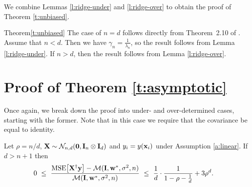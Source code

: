 \noindent
We combine Lemmas \ref{l:ridge-under} and \ref{l:ridge-over} to obtain
the proof of Theorem \ref{t:unbiased}.
\begin{proofof}{Theorem}{\ref{t:unbiased}}
The case of $n=d$ follows directly from Theorem~2.10 of
\cite{correcting-bias}.
Assume that $n<d$. Then we have
$\gamma_n=\frac1{\lambda_n}$, so the result follows
from Lemma \ref{l:ridge-under}.
If $n>d$, then the result follows from Lemma \ref{l:ridge-over}.
\end{proofof}

\section{Proof of Theorem \ref{t:asymptotic}}
\label{sec:proof-of-t-asymptotic}
Once again, we break down the proof into under- and
over-determined cases, starting with the former. Note that in this
case we require that the covariance be equal to identity.
\begin{lemma}\label{l:asymptotic-under}
  Let $\rho=n/d$, $\mathbf X\sim \mathcal{N}_{n,d}(\mathbf 0,\mathbf I_n \otimes \mathbf I_d)$ and $y_i=y(\mathbf x_i)$ under Assumption
  \ref{a:linear}. If $d>n+1$ then
  \begin{align*}
    &0\ \leq\ \frac{{\mathrm{MSE}\big[\mathbf X^\dagger\mathbf y\big]}-\mathcal M(\mathbf I,
\mathbf w^*,\sigma^2,n)}{\mathcal M(\mathbf I,\mathbf w^*,\sigma^2,n)}\ \leq\
\frac1d\cdot \frac{1}{1-\rho-\frac1d} + 3\rho^d.
  \end{align*}
\end{lemma}

